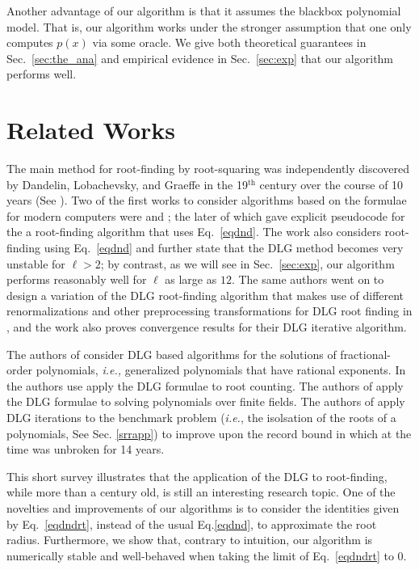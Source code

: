 \documentclass[sigconf]{acmart}
\begin{document}
Another advantage of our algorithm is that it assumes the blackbox polynomial model. That is, our algorithm works under the stronger assumption that one only computes $p(x)$ via some oracle. We give both theoretical guarantees in Sec.~\ref{sec:the_ana} and empirical evidence in Sec.~\ref{sec:exp} that our algorithm performs well.

\section{Related Works}
The main method for root-finding by root-squaring was independently discovered by Dandelin, Lobachevsky, and Graeffe in the 19$^\mathrm{th}$ century over the course of 10 years (See \cite{10.2307/2310626}). Two of the first works to consider algorithms based on the formulae for modern computers were \cite{10.1145/321186.321198} and \cite{10.1145/364955.364974}; the later of which gave explicit pseudocode for the a root-finding algorithm that uses Eq.~\ref{eqdnd}.
The work \cite{Malajovich2001OnTG} also considers root-finding using Eq.~\ref{eqdnd} and further state that the DLG method becomes very unstable for $\ell > 2$; by contrast, as we will see in Sec.~\ref{sec:exp}, our algorithm performs reasonably well for $\ell$ as large as $12$. The same authors went on to design a variation of the DLG root-finding algorithm that makes use of different renormalizations and other preprocessing transformations for DLG root finding in \cite{Malajovich2001TangentGI}, and the work also proves convergence results for their DLG iterative algorithm.

The authors of \cite{Bialas2010GeneralizationOV} consider DLG based algorithms for the solutions of fractional-order polynomials, \emph{i.e.,} generalized polynomials that have rational exponents. In \cite{Hoeven2011EfficientRC} the authors use apply the DLG formulae to root counting.
The authors of \cite{Grenet2015DeterministicRF} apply the DLG formulae to solving polynomials over finite fields. The authors of \cite{Becker2018ANS} apply DLG iterations to the benchmark problem (\emph{i.e.}, the isolsation of the roots of a polynomials, See Sec. \ref{srrapp}) to improve upon the record bound in \cite{pan2002univariate} which at the time was unbroken for 14 years.

This short survey illustrates that the application of the DLG to root-finding, while more than a century old, is still an interesting research topic. One of the novelties and improvements of our algorithms is to consider the identities given by Eq.~\ref{eqdndrt}, instead of the usual Eq.\ref{eqdnd}, to approximate the root radius. Furthermore, we show that, contrary to intuition, our algorithm is numerically stable and well-behaved when taking the limit of Eq.~\ref{eqdndrt} to 0.
\end{document}
